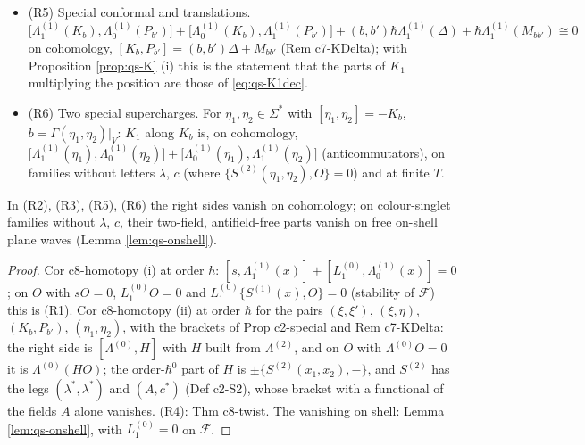 \begin{proposition}
\begin{itemize}
\item (R5) Special conformal and translations. $\big[\Lambda^{(1)}_1(K_b),\Lambda^{(1)}_0(P_{b'})\big]+\big[\Lambda^{(1)}_0(K_b),\Lambda^{(1)}_1(P_{b'})\big]+(b,b')\hbar\Lambda^{(1)}_1(\Delta)+\hbar\Lambda^{(1)}_1(M_{bb'})\cong0$ on cohomology, $[K_b,P_{b'}]=(b,b')\Delta+M_{bb'}$ (Rem c7-KDelta); with Proposition \ref{prop:qs-K} (i) this is the statement that the parts of $K_1$ multiplying the position are those of \eqref{eq:qs-K1dec}.
\item (R6) Two special supercharges. For $\eta_1,\eta_2\in\Sigma^*$ with $[\eta_1,\eta_2]=-K_{b}$, $b=\Gamma(\eta_1,\eta_2)|_V$: $K_1$ along $K_b$ is, on cohomology, $\big[\Lambda^{(1)}_1(\eta_1),\Lambda^{(1)}_0(\eta_2)\big]+\big[\Lambda^{(1)}_0(\eta_1),\Lambda^{(1)}_1(\eta_2)\big]$ (anticommutators), on families without letters $\lambda$, $c$ (where $\{S^{(2)}(\eta_1,\eta_2),O\}=0$) and at finite $T$.
\end{itemize}
In (R2), (R3), (R5), (R6) the right sides vanish on cohomology; on colour-singlet families without $\lambda$, $c$, their two-field, antifield-free parts vanish on free on-shell plane waves (Lemma \ref{lem:qs-onshell}).
\end{proposition}

\begin{proof}
Cor c8-homotopy (i) at order $\hbar$: $[s,\Lambda^{(1)}_1(x)]+[L_1^{(0)},\Lambda^{(1)}_0(x)]=0$; on $O$ with $sO=0$, $L_1^{(0)}O=0$ and $L_1^{(0)}\{S^{(1)}(x),O\}=0$ (stability of $\mathcal F$) this is (R1). Cor c8-homotopy (ii) at order $\hbar$ for the pairs $(\xi,\xi')$, $(\xi,\eta)$, $(K_b,P_{b'})$, $(\eta_1,\eta_2)$, with the brackets of Prop c2-special and Rem c7-KDelta: the right side is $[\Lambda^{(0)},H]$ with $H$ built from $\Lambda^{(2)}$, and on $O$ with $\Lambda^{(0)}O=0$ it is $\Lambda^{(0)}(HO)$; the order-$\hbar^0$ part of $H$ is $\pm\{S^{(2)}(x_1,x_2),-\}$, and $S^{(2)}$ has the legs $(\lambda^*,\lambda^*)$ and $(A,c^*)$ (Def c2-S2), whose bracket with a functional of the fields $A$ alone vanishes. (R4): Thm c8-twist. The vanishing on shell: Lemma \ref{lem:qs-onshell}, with $L_1^{(0)}=0$ on $\mathcal F$.
\end{proof}


